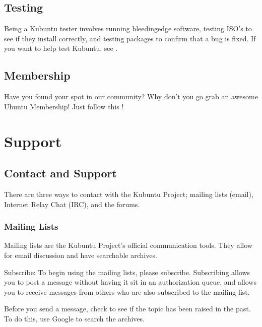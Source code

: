 \documentclass[letterpaper,10pt,english]{sphinxmanual}
\begin{document}
\section{Testing}
\label{\detokenize{docs/contribute:testing}}
\sphinxAtStartPar
Being a Kubuntu tester involves running bleeding\sphinxhyphen{}edge software, testing ISO’s to see if they install correctly, and testing packages to confirm that a bug is fixed. If you want to help test Kubuntu, see .


\section{Membership}
\label{\detokenize{docs/contribute:membership}}
\sphinxAtStartPar
Have you found your spot in our community? Why don’t you go grab an awesome Ubuntu Membership! Just follow this !


\chapter{Support}
\label{\detokenize{docs/support:support}}\label{\detokenize{docs/support:support-link}}\label{\detokenize{docs/support::doc}}

\section{Contact and Support}
\label{\detokenize{docs/support:contact-and-support}}
\sphinxAtStartPar
There are three ways to contact with the Kubuntu Project; mailing lists (email), Internet Relay Chat (IRC), and the forums.


\subsection{Mailing Lists}
\label{\detokenize{docs/support:mailing-lists}}
\sphinxAtStartPar
Mailing lists are the Kubuntu Project’s official communication tools. They allow for email discussion and have searchable archives.

\sphinxAtStartPar
Subscribe:
To begin using the mailing lists, please subscribe. Subscribing allows you to post a message without having it sit in an authorization queue, and allows you to receive messages from others who are also subscribed to the mailing list.

\sphinxAtStartPar
Before you send a message, check to see if the topic has been raised in the past. To do this, use Google to search the archives.
\end{document}
